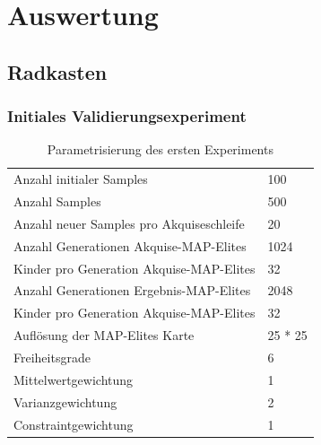 \section{Auswertung}

\subsection{Radkasten}

\subsubsection{Initiales Validierungsexperiment}
\label{sub:exp1st}
\begin{table}[h]
	\centering
	\begin{tabularx}{.75\textwidth}{ll}\hline
		Anzahl initialer Samples & 100 \\
		Anzahl Samples & 500 \\
		Anzahl neuer Samples pro Akquiseschleife & 20 \\
		Anzahl Generationen Akquise-MAP-Elites & 1024 \\
		Kinder pro Generation Akquise-MAP-Elites & 32 \\
		Anzahl Generationen Ergebnis-MAP-Elites & 2048 \\
		Kinder pro Generation Akquise-MAP-Elites & 32 \\
		Auflösung der MAP-Elites Karte & 25 * 25  \\
		\hline
		Freiheitsgrade & 6 \\
		Mittelwertgewichtung & 1 \\
		Varianzgewichtung & 2 \\
		Constraintgewichtung & 1 \\
	\end{tabularx}
	\caption{Parametrisierung des ersten Experiments}
	\label{tab:param1st}
\end{table}

